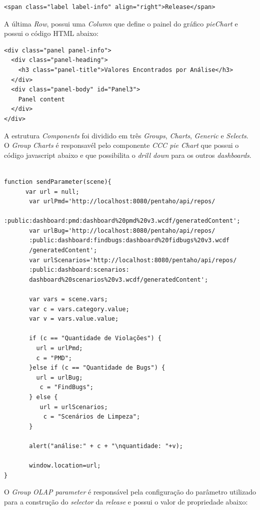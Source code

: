 \begin{apendicesenv}
\begin{verbatim}
<span class="label label-info" align="right">Release</span> 
\end{verbatim}

A última \textit{Row}, possui uma \textit{Column} que define o painel do gráfico \textit{pieChart} e possui o código HTML abaixo:

\begin{verbatim}
<div class="panel panel-info">
  <div class="panel-heading">
    <h3 class="panel-title">Valores Encontrados por Análise</h3>
  </div>
  <div class="panel-body" id="Panel3">
    Panel content
  </div>
</div> 
\end{verbatim}

A estrutura \textit{Components} foi dividido em três \textit{Groups}, \textit{Charts}, \textit{Generic} e \textit{Selects}. O \textit{Group} \textit{Charts} é responsavél pelo componente \textit{CCC pie Chart} que possui o código javascript abaixo e que possibilita o \textit{drill down} para os outros \textit{dashboards}.

\begin{verbatim}

function sendParameter(scene){
      var url = null;
       var urlPmd='http://localhost:8080/pentaho/api/repos/
       :public:dashboard:pmd:dashboard%20pmd%20v3.wcdf/generatedContent';
       var urlBug='http://localhost:8080/pentaho/api/repos/
       :public:dashboard:findbugs:dashboard%20fidbugs%20v3.wcdf
       /generatedContent';
       var urlScenarios='http://localhost:8080/pentaho/api/repos/
       :public:dashboard:scenarios:
       dashboard%20scenarios%20v3.wcdf/generatedContent';
       
       var vars = scene.vars;
       var c = vars.category.value;
       var v = vars.value.value;
       
       if (c == "Quantidade de Violações") {
         url = urlPmd;
         c = "PMD";
       }else if (c == "Quantidade de Bugs") {
         url = urlBug;
          c = "FindBugs";
       } else {
          url = urlScenarios;
           c = "Scenários de Limpeza";
       } 
       
       alert("análise:" + c + "\nquantidade: "+v);
      
       window.location=url;  
} 
\end{verbatim}

O \textit{Group} \textit{OLAP parameter} é responsável pela configuração do parâmetro utilizado para a construção do \textit{selector} da \textit{release} e possui o valor de propriedade abaixo:


\end{apendicesenv}
